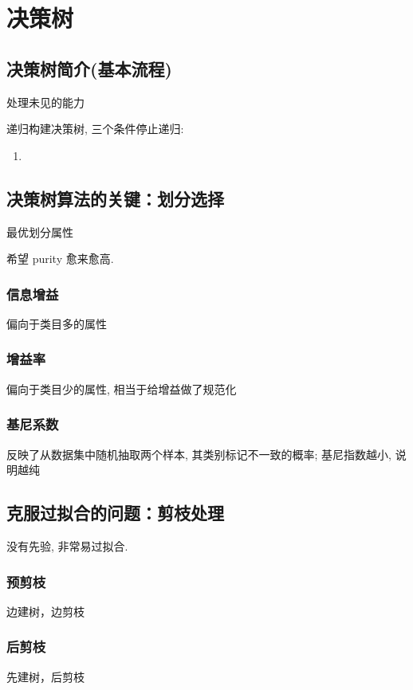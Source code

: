 \newpage
\section{决策树}
\subsection{决策树简介(基本流程)}
处理未见的能力

递归构建决策树, 三个条件停止递归:
\begin{enumerate}
    \item 
\end{enumerate}




\subsection{决策树算法的关键：划分选择}
最优划分属性

希望 purity 愈来愈高. 

\subsubsection{信息增益}%

偏向于类目多的属性

\subsubsection{增益率}

偏向于类目少的属性, 相当于给增益做了规范化

\subsubsection{基尼系数}
反映了从数据集中随机抽取两个样本, 其类别标记不一致的概率; 基尼指数越小, 说明越纯

\subsection{克服过拟合的问题：剪枝处理}
没有先验, 非常易过拟合. 

\subsubsection{预剪枝}
边建树，边剪枝

\subsubsection{后剪枝}
先建树，后剪枝

